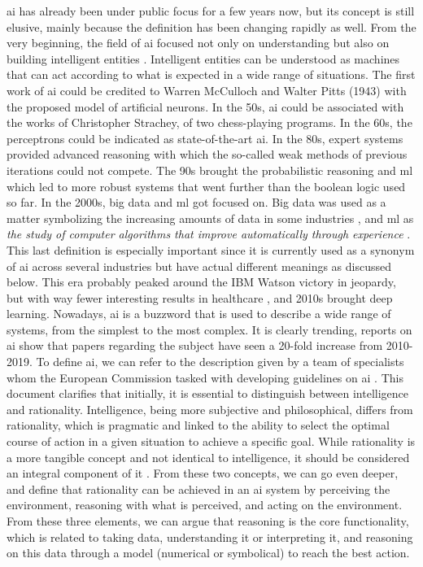 \ac{ai} has already been under public focus for a few years now, but its concept is still elusive, mainly because the definition has been changing rapidly as well.
From the very beginning, the field of \ac{ai} focused not only on understanding but also on building intelligent entities \cite{DBLP:books/aw/RN2020}. Intelligent entities can be understood as machines that can act according to what is expected in a wide range of situations.
The first work of \ac{ai} could be credited to Warren McCulloch and Walter Pitts (1943) with the proposed model of artificial neurons. In the 50s, \ac{ai} could be associated with the works of Christopher Strachey, of two chess-playing programs.
In the 60s, the perceptrons could be indicated as state-of-the-art \ac{ai}. In the 80s, expert systems provided advanced reasoning with which the so-called weak methods of previous iterations could not compete.
The 90s brought the probabilistic reasoning and \ac{ml} which led to more robust systems that went further than the boolean logic used so far. In the 2000s, big data and \ac{ml} got focused on. Big data was used as a matter symbolizing the increasing amounts of data in some industries \cite{dashBigDataHealthcare2019}, and \ac{ml} as \textit{ the study of computer algorithms that improve automatically through experience} \cite{mitchell1997machine}. This last definition is especially important since it is currently used as a synonym of \ac{ai} across several industries but have actual different meanings as discussed below. This era probably peaked around the IBM Watson victory in jeopardy, but with way fewer interesting results in healthcare \cite{swetlitzIBMWatsonSupercomputer2018}, and 2010s brought deep learning. 
Nowadays, \ac{ai} is a buzzword that is used to describe a wide range of systems, from the simplest to the most complex. It is clearly trending, reports on \ac{ai} show that papers regarding the subject have seen a 20-fold increase from 2010-2019.
To define \ac{ai}, we can refer to the description given by a team of specialists whom the European Commission tasked with developing guidelines on \ac{ai} \cite{DefinitionAIMain2019}. This document clarifies that initially, it is essential to distinguish between intelligence and rationality. Intelligence, being more subjective and philosophical, differs from rationality, which is pragmatic and linked to the ability to select the optimal course of action in a given situation to achieve a specific goal. While rationality is a more tangible concept and not identical to intelligence, it should be considered an integral component of it \cite{DefinitionAIMain2019,DBLP:books/aw/RN2020}.
From these two concepts, we can go even deeper, and define that rationality can be achieved in an \ac{ai} system by perceiving the environment, reasoning with what is perceived, and acting on the environment. From these three elements, we can argue that reasoning is the core functionality, which is related to taking data, understanding it or interpreting it, and reasoning on this data through a model (numerical or symbolical) to reach the best action.

